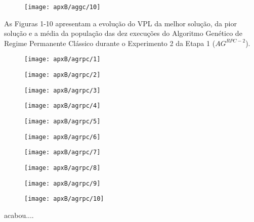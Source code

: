\begin{figure}[H]
\centering

\texttt{[image: apxB/aggc/10]}

\end{figure}

As Figuras 1-10 apresentam a evolução do VPL da melhor solução, da pior solução e a média da população das dez execuções do Algoritmo Genético de Regime Permanente Clássico durante o Experimento 2 da Etapa 1 ($AG^{RPC-2}$).

\begin{figure}[H]
\centering

\texttt{[image: apxB/agrpc/1]}

\end{figure}

\begin{figure}[H]
\centering

\texttt{[image: apxB/agrpc/2]}

\end{figure}

\begin{figure}[H]
\centering

\texttt{[image: apxB/agrpc/3]}

\end{figure}

\begin{figure}[H]
\centering

\texttt{[image: apxB/agrpc/4]}

\end{figure}

\begin{figure}[H]
\centering

\texttt{[image: apxB/agrpc/5]}

\end{figure}

\begin{figure}[H]
\centering

\texttt{[image: apxB/agrpc/6]}

\end{figure}

\begin{figure}[H]
\centering

\texttt{[image: apxB/agrpc/7]}

\end{figure}

\begin{figure}[H]
\centering

\texttt{[image: apxB/agrpc/8]}

\end{figure}


\begin{figure}[H]
\centering

\texttt{[image: apxB/agrpc/9]}

\end{figure}

\begin{figure}[H]
\centering

\texttt{[image: apxB/agrpc/10]}

\end{figure}

acabou....